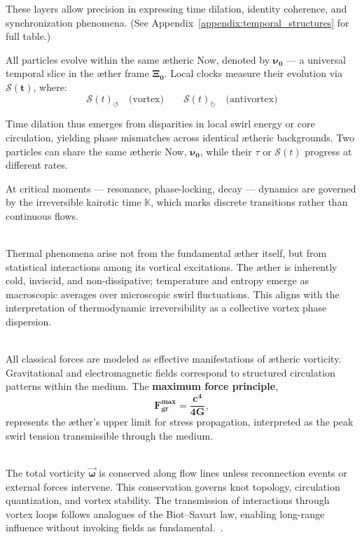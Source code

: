 \documentclass[a4paper,12pt]{article}
\begin{document}
\begin{description}
    These layers allow precision in expressing time dilation, identity coherence, and synchronization phenomena. (See Appendix~\ref{appendix:temporal_structures} for full table.)

    All particles evolve within the same ætheric Now, denoted by $\boldsymbol{\nu_0}$ — a universal temporal slice in the æther frame $\boldsymbol{\Xi_0}$. Local clocks measure their evolution via $\boldsymbol{\mathcal{S}(t)}$, where:
    \[
    \mathcal{S}(t)_{\circlearrowleft} \quad \text{(vortex)} \qquad \mathcal{S}(t)_{\circlearrowright} \quad \text{(antivortex)}
    \]

    Time dilation thus emerges from disparities in local swirl energy or core circulation, yielding phase mismatches across identical ætheric backgrounds. Two particles can share the same ætheric Now, $\boldsymbol{\nu_0}$, while their $\tau$ or $\mathcal{S}(t)$ progress at different rates.

    At critical moments — resonance, phase-locking, decay — dynamics are governed by the irreversible kairotic time $\boldsymbol{\mathbb{K}}$, which marks discrete transitions rather than continuous flows.


    \item[\textbf{Postulate V: Thermodynamics as Emergent Behavior}] \hfill \\
    Thermal phenomena arise not from the fundamental æther itself, but from statistical interactions among its vortical excitations. The æther is inherently cold, inviscid, and non-dissipative; temperature and entropy emerge as macroscopic averages over microscopic swirl fluctuations. This aligns with the interpretation of thermodynamic irreversibility as a collective vortex phase dispersion.

    \item[\textbf{Postulate VI: Forces via Vorticity Fields}] \hfill \\
    All classical forces are modeled as effective manifestations of ætheric vorticity. Gravitational and electromagnetic fields correspond to structured circulation patterns within the medium. The \textbf{maximum force principle},
    \[
    \boldsymbol{F^{\text{max}}_{\text{gr}} = \frac{c^4}{4G}},
    \]
    represents the æther’s upper limit for stress propagation, interpreted as the peak swirl tension transmissible through the medium.

    \item[\textbf{Postulate VII: Vorticity Conservation and Topology}] \hfill \\
    The total vorticity $\boldsymbol{\vec{\omega}}$ is conserved along flow lines unless reconnection events or external forces intervene. This conservation governs knot topology, circulation quantization, and vortex stability. The transmission of interactions through vortex loops follows analogues of the Biot–Savart law, enabling long-range influence without invoking fields as fundamental.~\cite{helmholtz1858vortices}.
\end{description}
\end{document}
